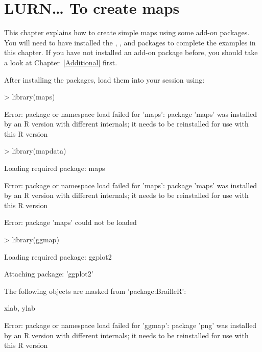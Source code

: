 

\chapter{LURN\ldots{} To create maps} 
\label{Maps} 
 



 
This chapter explains how to create simple maps using some add-on packages. You will need to have installed the , , and   packages to complete the examples in this chapter. If you have not installed an add-on package before, you should take a look at Chapter~\ref{Additional} first. 
 
After installing the packages, load them into your \R{} session using: 

\begin{Schunk}
\begin{Sinput}
> library(maps) 
\end{Sinput}
\begin{Soutput}
Error: package or namespace load failed for 'maps':
 package 'maps' was installed by an R version with different internals; it needs to be reinstalled for use with this R version
\end{Soutput}
\begin{Sinput}
> library(mapdata) 
\end{Sinput}
\begin{Soutput}
Loading required package: maps
\end{Soutput}
\begin{Soutput}
Error: package or namespace load failed for 'maps':
 package 'maps' was installed by an R version with different internals; it needs to be reinstalled for use with this R version
\end{Soutput}
\begin{Soutput}
Error: package 'maps' could not be loaded
\end{Soutput}
\begin{Sinput}
> library(ggmap) 
\end{Sinput}
\begin{Soutput}
Loading required package: ggplot2
\end{Soutput}
\begin{Soutput}

Attaching package: 'ggplot2'
\end{Soutput}
\begin{Soutput}
The following objects are masked from 'package:BrailleR':

    xlab, ylab
\end{Soutput}
\begin{Soutput}
Error: package or namespace load failed for 'ggmap':
 package 'png' was installed by an R version with different internals; it needs to be reinstalled for use with this R version
\end{Soutput}
\end{Schunk}

